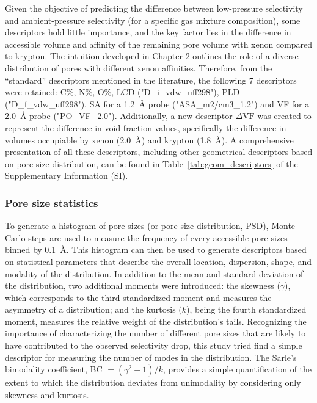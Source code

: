 \documentclass[main]{subfiles}
\begin{document}
Given the objective of predicting the difference between low-pressure selectivity and ambient-pressure selectivity (for a specific gas mixture composition), some descriptors hold little importance, and the key factor lies in the difference in accessible volume and affinity of the remaining pore volume with xenon compared to krypton. The intuition developed in Chapter 2 outlines the role of a diverse distribution of pores with different xenon affinities. Therefore, from the ``standard'' descriptors mentioned in the literature, the following 7 descriptors were retained: C\%, N\%, O\%, LCD ("D\_i\_vdw\_uff298"), PLD ("D\_f\_vdw\_uff298"), SA for a \SI{1.2}{\angstrom} probe ("ASA\_m2/cm3\_1.2") and VF for a \SI{2.0}{\angstrom} probe ("PO\_VF\_2.0"). Additionally, a new descriptor $\Delta \text{VF}$ was created to represent the difference in void fraction values, specifically the difference in volumes occupiable by xenon (\SI{2.0}{\angstrom}) and krypton (\SI{1.8}{\angstrom}). A comprehensive presentation of all these descriptors, including other geometrical descriptors based on pore size distribution, can be found in Table~\ref{tab:geom_descriptors} of the Supplementary Information (SI).

\subsubsection{Pore size statistics}

To generate a histogram of pore sizes (or pore size distribution, PSD), Monte Carlo steps are used to measure the frequency of every accessible pore sizes binned by \SI{0.1}{\angstrom}.\autocite{poresize_Pinheiro2013} This histogram can then be used to generate descriptors based on statistical parameters that describe the overall location, dispersion, shape, and modality of the distribution. In addition to the mean and standard deviation of the distribution, two additional moments were introduced: the skewness ($\gamma$), which corresponds to the third standardized moment and measures the asymmetry of a distribution; and the kurtosis ($k$), being the fourth standardized moment, measures the relative weight of the distribution's tails. Recognizing the importance of characterizing the number of different pore sizes that are likely to have contributed to the observed selectivity drop, this study tried find a simple descriptor for measuring the number of modes in the distribution. The Sarle's bimodality coefficient, BC $= (\gamma^2 +1)/k$, provides a simple quantification of the extent to which the distribution deviates from unimodality by considering only skewness and kurtosis\autocite{Tarba_2022}.
\end{document}
